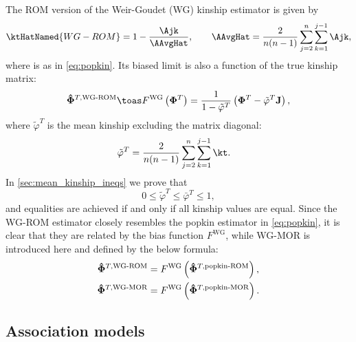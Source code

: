 \documentclass[11pt]{article}
\newcommand{\kinMat}[1][T]{%
  \ensuremath{%
    \mathbf{\Phi}^{#1}
  }%
  \xspace%
}%
\newcommand{\kinMatEstNamed}[1]{%
  \ensuremath{%
    \mathbf{\hat{\Phi}}^{T,\text{#1}}
  }%
  \xspace%
}%
\begin{document}
The ROM version of the Weir-Goudet (WG) kinship estimator is given by \citep{weir_unified_2017, ochoa_estimating_2021}
\begin{equation}
  \label{eq:wg}
  \ktHatNamed{WG-ROM}
  =
  1 - \frac{\Ajk}{\AAvgHat}
  , \quad\quad
  \AAvgHat
  =
  \frac{2}{n(n-1)}
  \sum_{j=2}^n
  \sum_{k=1}^{j-1}
    \Ajk
    ,
\end{equation}
where \Ajk is as in \cref{eq:popkin}.
Its biased limit is also a function of the true kinship matrix:
\begin{equation}
  \label{eq:wg_lim}
  \kinMatEstNamed{WG-ROM}
  \toas
  F^\text{WG} \left( \kinMat \right)
  =
  \frac{1}{1 - \tilde{\varphi}^T}
  \left( \kinMat - \tilde{\varphi}^T \mathbf{J} \right)
  ,
\end{equation}
where $\tilde{\varphi}^T$ is the mean kinship excluding the matrix diagonal:
\begin{equation}
  \label{eq:wg_tilde}
  \begin{split}
    \tilde{\varphi}^T
    &=
    \frac{2}{n(n-1)}
    \sum_{j=2}^n
    \sum_{k=1}^{j-1}
    \kt
    .
  \end{split}
\end{equation}
In \cref{sec:mean_kinship_ineqs} we prove that
$$
0 \le \tilde{\varphi}^T \le \bar{\varphi}^T \le 1,
$$
and equalities are achieved if and only if all kinship values are equal.
Since the WG-ROM estimator closely resembles the popkin estimator in \cref{eq:popkin}, it is clear that they are related by the bias function $F^\text{WG}$, while WG-MOR is introduced here and defined by the below formula:
\begin{align*}
  \kinMatEstNamed{WG-ROM}
  &=
    F^\text{WG} \left( \kinMatEstNamed{popkin-ROM} \right)
    , \\
  \kinMatEstNamed{WG-MOR}
  &=
    F^\text{WG} \left( \kinMatEstNamed{popkin-MOR} \right)
  .
\end{align*}

\subsection{Association models}
\end{document}
